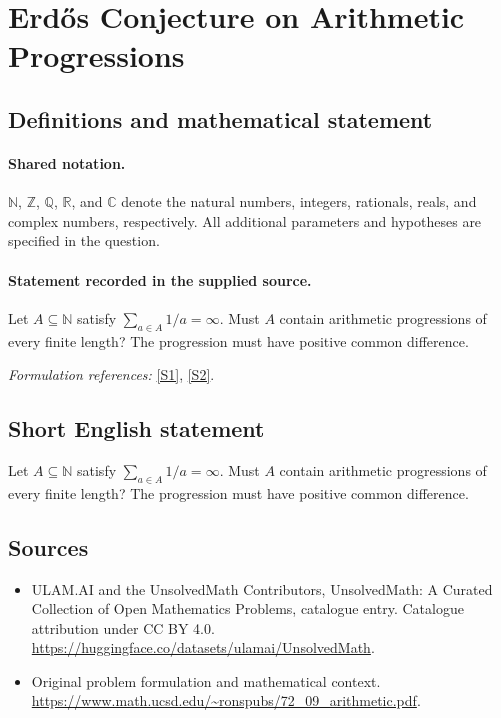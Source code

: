 \documentclass[11pt]{article}
\newcommand{\sref}[2]{\hyperlink{source:#1:#2}{[S#2]}}
\begin{document}
\section{Erdős Conjecture on Arithmetic Progressions}\label{statement}

\subsection{Definitions and mathematical statement}

\paragraph{Shared notation.}$\mathbb N$, $\mathbb Z$, $\mathbb Q$, $\mathbb R$, and $\mathbb C$ denote the natural numbers, integers, rationals, reals, and complex numbers, respectively. All additional parameters and hypotheses are specified in the question.


\paragraph{Statement recorded in the supplied source.}
Let $A\subseteq\mathbb N$ satisfy $\sum_{a\in A}1/a=\infty$. Must $A$ contain arithmetic progressions of every finite length? The progression must have positive common difference.
\par\smallskip\textit{Formulation references:} \sref{statement}{1}, \sref{statement}{2}.
\subsection{Short English statement}
Let $A\subseteq\mathbb N$ satisfy $\sum_{a\in A}1/a=\infty$. Must $A$ contain arithmetic progressions of every finite length? The progression must have positive common difference.
\subsection{Sources}
\begin{itemize}
\item[\hypertarget{source:statement:1}{S1}] ULAM.AI and the UnsolvedMath Contributors, UnsolvedMath: A Curated Collection of Open Mathematics Problems, catalogue entry. Catalogue attribution under CC BY 4.0.
\url{https://huggingface.co/datasets/ulamai/UnsolvedMath}.
\item[\hypertarget{source:statement:2}{S2}] Original problem formulation and mathematical context.
\url{https://www.math.ucsd.edu/~ronspubs/72_09_arithmetic.pdf}.
\end{itemize}
\label{end:statement}
\end{document}
